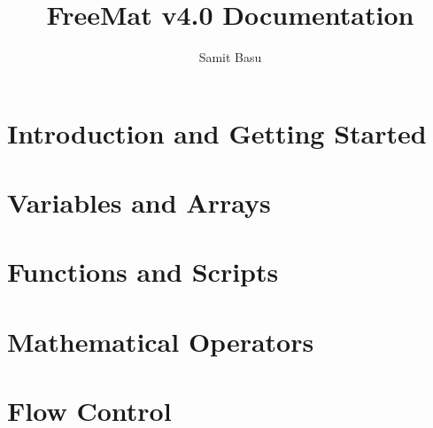 \documentclass{book}
\title{FreeMat v4.0 Documentation}
\author{Samit Basu}
\begin{document}
\maketitle
\tableofcontents
\chapter{Introduction and Getting Started}

\chapter{Variables and Arrays}







\chapter{Functions and Scripts}









\chapter{Mathematical Operators}
















\chapter{Flow Control}













\end{document}
